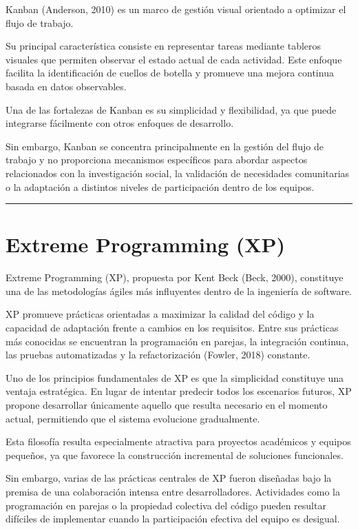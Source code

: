 \documentclass[14pt,a4paper,oneside]{extbook}
\begin{document}
Kanban (Anderson, 2010) es un marco de gestión visual orientado a optimizar el flujo de trabajo.

Su principal característica consiste en representar tareas mediante tableros visuales que permiten observar el estado actual de cada actividad. Este enfoque facilita la identificación de cuellos de botella y promueve una mejora continua basada en datos observables.

Una de las fortalezas de Kanban es su simplicidad y flexibilidad, ya que puede integrarse fácilmente con otros enfoques de desarrollo.

Sin embargo, Kanban se concentra principalmente en la gestión del flujo de trabajo y no proporciona mecanismos específicos para abordar aspectos relacionados con la investigación social, la validación de necesidades comunitarias o la adaptación a distintos niveles de participación dentro de los equipos.

\par\vspace{1.5em}\noindent\hfill\rule{0.25\textwidth}{0.6pt}\hfill\par\vspace{1.5em}

\section{Extreme Programming (XP)}

Extreme Programming (XP), propuesta por Kent Beck (Beck, 2000), constituye una de las metodologías ágiles más influyentes dentro de la ingeniería de software.

XP promueve prácticas orientadas a maximizar la calidad del código y la capacidad de adaptación frente a cambios en los requisitos. Entre sus prácticas más conocidas se encuentran la programación en parejas, la integración continua, las pruebas automatizadas y la refactorización (Fowler, 2018) constante.

Uno de los principios fundamentales de XP es que la simplicidad constituye una ventaja estratégica. En lugar de intentar predecir todos los escenarios futuros, XP propone desarrollar únicamente aquello que resulta necesario en el momento actual, permitiendo que el sistema evolucione gradualmente.

Esta filosofía resulta especialmente atractiva para proyectos académicos y equipos pequeños, ya que favorece la construcción incremental de soluciones funcionales.

Sin embargo, varias de las prácticas centrales de XP fueron diseñadas bajo la premisa de una colaboración intensa entre desarrolladores. Actividades como la programación en parejas o la propiedad colectiva del código pueden resultar difíciles de implementar cuando la participación efectiva del equipo es desigual.
\end{document}
